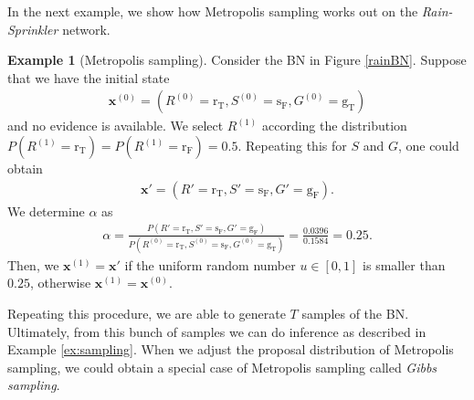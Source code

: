 \documentclass[a4paper, twoside, 11pt]{report}
\theoremstyle{plain}
\theoremstyle{definition}
\newtheorem{example}[thm]{Example}
\theoremstyle{remark}
\newcommand{\gT}{{\text{g}_\text{T} }}
\newcommand{\gF}{{\text{g}_\text{F} }}
\newcommand{\sF}{{\text{s}_\text{F} }}
\newcommand{\rT}{{\text{r}_\text{T} }}
\newcommand{\rF}{{\text{r}_\text{F} }}
\newcommand{\bfx}{{\mathbf{x}}}
\begin{document}
In the next example, we show how Metropolis sampling works out on the \textit{Rain-Sprinkler} network.
\begin{example}[Metropolis sampling]
Consider the BN in Figure \ref{rainBN}. Suppose that we have the initial state 
\begin{align*}
\bfx^{(0)} = (R^{(0)} = \rT, S^{(0)} = \sF, G^{(0)} = \gT)
\end{align*}
and no evidence is available. We select $R^{(1)}$ according the distribution $P(R^{(1)}=\rT)=P(R^{(1)}=\rF) = 0.5$. Repeating this for $S$ and $G$, one could obtain
\begin{align*}
\bfx' = (R' = \rT, S' = \sF, G' = \gF).
\end{align*}
We determine $\alpha$ as
\begin{align*}
\alpha = \frac{P(R' = \rT, S' = \sF, G' = \gF)}{P(R^{(0)} = \rT, S^{(0)} = \sF, G^{(0)} = \gT)} = \frac{0.0396}{0.1584} = 0.25. 
\end{align*}
Then, we $\bfx^{(1)} = \bfx'$ if the uniform random number $u \in [0,1]$ is smaller than $0.25$, otherwise $\bfx^{(1)} = \bfx^{(0)}$.
\end{example}
Repeating this procedure, we are able to generate $T$ samples of the BN. Ultimately, from this bunch of samples we can do inference as described in Example \ref{ex:sampling}. When we adjust the proposal distribution of Metropolis sampling, we could obtain a special case of Metropolis sampling called \textit{Gibbs sampling}. 
\end{document}
